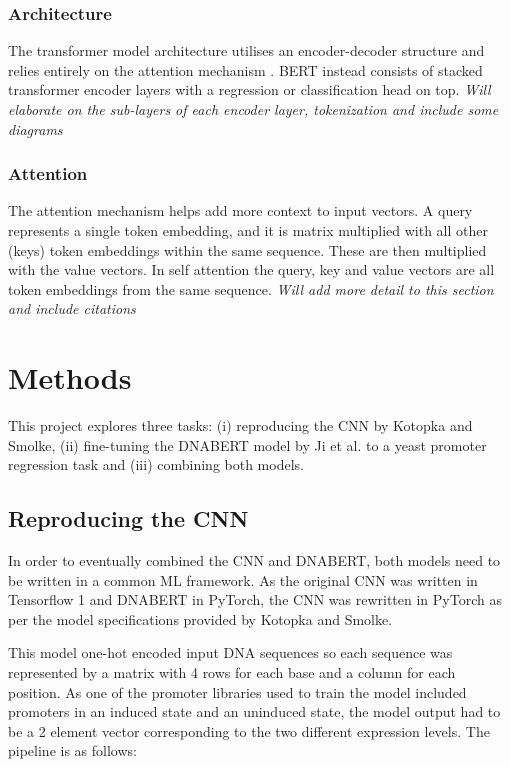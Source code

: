 \documentclass{article}
\begin{document}
\subsubsection{Architecture}
The transformer model architecture utilises an encoder-decoder structure and relies entirely on the attention mechanism \cite{vaswani2017attention}. BERT instead consists of stacked transformer encoder layers with a regression or classification head on top. \textit{Will elaborate on the sub-layers of each encoder layer, tokenization and include some diagrams}

\subsubsection{Attention}
The attention mechanism helps add more context to input vectors. A query represents a single token embedding, and it is matrix multiplied with all other (keys) token embeddings within the same sequence. These are then multiplied with the value vectors. In self attention the query, key and value vectors are all token embeddings from the same sequence. \textit{Will add more detail to this section and include citations}



\section{Methods}
This project explores three tasks: (i) reproducing the CNN by Kotopka and Smolke, (ii) fine-tuning the DNABERT model by Ji et al. to a yeast promoter regression task and (iii) combining both models. 

\subsection{Reproducing the CNN}
In order to eventually combined the CNN and DNABERT, both models need to be written in a common ML framework. As the original CNN was written in Tensorflow 1 and DNABERT in PyTorch, the CNN was rewritten in PyTorch as per the model specifications provided by Kotopka and Smolke.

This model one-hot encoded input DNA sequences so each sequence was represented by a matrix with 4 rows for each base and a column for each position. As one of the promoter libraries used to train the model included promoters in an induced state and an uninduced state, the model output had to be a 2 element vector corresponding to the two different expression levels. The pipeline is as follows:
\end{document}
